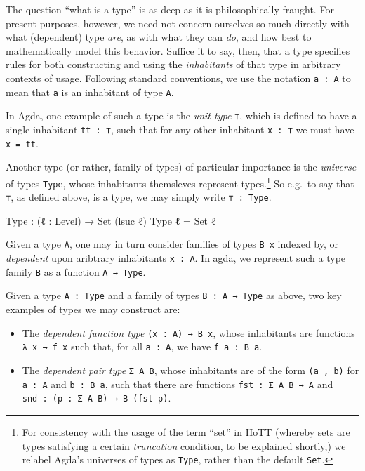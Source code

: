 \documentclass[
  11pt,
  oneside,
  article]{memoir}
\newenvironment{Shaded}{}{}
\newcommand{\DataTypeTok}[1]{\textcolor[rgb]{0.56,0.13,0.00}{#1}}
\newcommand{\NormalTok}[1]{#1}
\newcommand{\OtherTok}[1]{\textcolor[rgb]{0.00,0.44,0.13}{#1}}
\providecommand{\tightlist}{%
  \setlength{\itemsep}{0pt}\setlength{\parskip}{0pt}}
\theoremstyle{definition}
\theoremstyle{plain}
\newcommand{\0}{\textsf{0}}
\newcommand{\1}{\tn{\textsf{1}}}
\begin{document}
The question ``what is a type'' is as deep as it is philosophically
fraught. For present purposes, however, we need not concern ourselves so
much directly with what (dependent) type \emph{are}, as with what they
can \emph{do}, and how best to mathematically model this behavior.
Suffice it to say, then, that a type specifies rules for both
constructing and using the \emph{inhabitants} of that type in arbitrary
contexts of usage. Following standard conventions, we use the notation
\texttt{a\ :\ A} to mean that \texttt{a} is an inhabitant of type
\texttt{A}.

In Agda, one example of such a type is the \emph{unit type} \texttt{⊤},
which is defined to have a single inhabitant \texttt{tt\ :\ ⊤}, such
that for any other inhabitant \texttt{x\ :\ ⊤} we must have
\texttt{x\ =\ tt}.

Another type (or rather, family of types) of particular importance is
the \emph{universe} of types \texttt{Type}, whose inhabitants themsleves
represent types.\footnote{For consistency with the usage of the term
  ``set'' in HoTT (whereby sets are types satisfying a certain
  \emph{truncation} condition, to be explained shortly,) we relabel
  Agda's universes of types as \texttt{Type}, rather than the default
  \texttt{Set}.} So e.g.~to say that \texttt{⊤}, as defined above, is a
type, we may simply write \texttt{⊤\ :\ Type}.

\begin{Shaded}
\begin{Highlighting}[]
\NormalTok{Type }\OtherTok{:} \OtherTok{(}\NormalTok{ℓ }\OtherTok{:}\NormalTok{ Level}\OtherTok{)} \OtherTok{→} \DataTypeTok{Set} \OtherTok{(}\NormalTok{lsuc ℓ}\OtherTok{)}
\NormalTok{Type ℓ }\OtherTok{=} \DataTypeTok{Set}\NormalTok{ ℓ}
\end{Highlighting}
\end{Shaded}

Given a type \texttt{A}, one may in turn consider families of types
\texttt{B\ x} indexed by, or \emph{dependent} upon aribtrary inhabitants
\texttt{x\ :\ A}. In agda, we represent such a type family \texttt{B} as
a function \texttt{A\ →\ Type}.

Given a type \texttt{A\ :\ Type} and a family of types
\texttt{B\ :\ A\ →\ Type} as above, two key examples of types we may
construct are:

\begin{itemize}
\tightlist
\item
  The \emph{dependent function type} \texttt{(x\ :\ A)\ →\ B\ x}, whose
  inhabitants are functions \texttt{λ\ x\ →\ f\ x} such that, for all
  \texttt{a\ :\ A}, we have \texttt{f\ a\ :\ B\ a}.
\item
  The \emph{dependent pair type} \texttt{Σ\ A\ B}, whose inhabitants are
  of the form \texttt{(a\ ,\ b)} for \texttt{a\ :\ A} and
  \texttt{b\ :\ B\ a}, such that there are functions
  \texttt{fst\ :\ Σ\ A\ B\ →\ A} and
  \texttt{snd\ :\ (p\ :\ Σ\ A\ B)\ →\ B\ (fst\ p)}.
\end{itemize}
\end{document}
